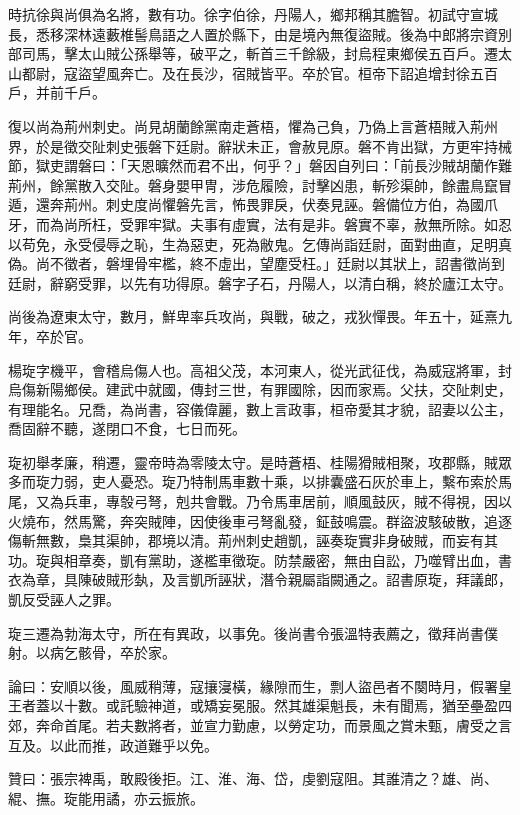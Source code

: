 \begin{pinyinscope}
時抗徐與尚俱為名將，數有功。徐字伯徐，丹陽人，鄉邦稱其膽智。初試守宣城長，悉移深林遠藪椎髻鳥語之人置於縣下，由是境內無復盜賊。後為中郎將宗資別部司馬，擊太山賊公孫舉等，破平之，斬首三千餘級，封烏程東鄉侯五百戶。遷太山都尉，寇盜望風奔亡。及在長沙，宿賊皆平。卒於官。桓帝下詔追增封徐五百戶，并前千戶。

復以尚為荊州刺史。尚見胡蘭餘黨南走蒼梧，懼為己負，乃偽上言蒼梧賊入荊州界，於是徵交阯刺史張磐下廷尉。辭狀未正，會赦見原。磐不肯出獄，方更牢持械節，獄吏謂磐曰：「天恩曠然而君不出，何乎？」磐因自列曰：「前長沙賊胡蘭作難荊州，餘黨散入交阯。磐身嬰甲冑，涉危履險，討擊凶患，斬殄渠帥，餘盡鳥竄冒遁，還奔荊州。刺史度尚懼磐先言，怖畏罪戾，伏奏見誣。磐備位方伯，為國爪牙，而為尚所枉，受罪牢獄。夫事有虛實，法有是非。磐實不辜，赦無所除。如忍以苟免，永受侵辱之恥，生為惡吏，死為敝鬼。乞傳尚詣廷尉，面對曲直，足明真偽。尚不徵者，磐埋骨牢檻，終不虛出，望塵受枉。」廷尉以其狀上，詔書徵尚到廷尉，辭窮受罪，以先有功得原。磐字子石，丹陽人，以清白稱，終於廬江太守。

尚後為遼東太守，數月，鮮卑率兵攻尚，與戰，破之，戎狄憚畏。年五十，延熹九年，卒於官。

楊琁字機平，會稽烏傷人也。高祖父茂，本河東人，從光武征伐，為威寇將軍，封烏傷新陽鄉侯。建武中就國，傳封三世，有罪國除，因而家焉。父扶，交阯刺史，有理能名。兄喬，為尚書，容儀偉麗，數上言政事，桓帝愛其才貌，詔妻以公主，喬固辭不聽，遂閉口不食，七日而死。

琁初舉孝廉，稍遷，靈帝時為零陵太守。是時蒼梧、桂陽猾賊相聚，攻郡縣，賊眾多而琁力弱，吏人憂恐。琁乃特制馬車數十乘，以排囊盛石灰於車上，繫布索於馬尾，又為兵車，專彀弓弩，剋共會戰。乃令馬車居前，順風鼓灰，賊不得視，因以火燒布，然馬驚，奔突賊陣，因使後車弓弩亂發，鉦鼓鳴震。群盜波駭破散，追逐傷斬無數，梟其渠帥，郡境以清。荊州刺史趙凱，誣奏琁實非身破賊，而妄有其功。琁與相章奏，凱有黨助，遂檻車徵琁。防禁嚴密，無由自訟，乃噬臂出血，書衣為章，具陳破賊形埶，及言凱所誣狀，潛令親屬詣闕通之。詔書原琁，拜議郎，凱反受誣人之罪。

琁三遷為勃海太守，所在有異政，以事免。後尚書令張溫特表薦之，徵拜尚書僕射。以病乞骸骨，卒於家。

論曰：安順以後，風威稍薄，寇攘寖橫，緣隙而生，剽人盜邑者不闋時月，假署皇王者蓋以十數。或託驗神道，或矯妄冕服。然其雄渠魁長，未有聞焉，猶至壘盈四郊，奔命首尾。若夫數將者，並宣力勤慮，以勞定功，而景風之賞未甄，膚受之言互及。以此而推，政道難乎以免。

贊曰：張宗裨禹，敢殿後拒。江、淮、海、岱，虔劉寇阻。其誰清之？雄、尚、緄、撫。琁能用譎，亦云振旅。


\end{pinyinscope}